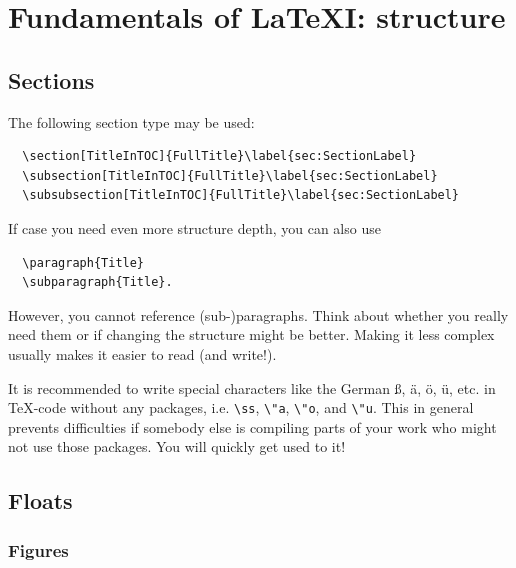 \section{Fundamentals of \LaTeX I: structure}
\label{sec:struct}

\subsection{Sections}
\label{sec:sec}
The following section type may be used:

\begin{verbatim}
  \section[TitleInTOC]{FullTitle}\label{sec:SectionLabel}
  \subsection[TitleInTOC]{FullTitle}\label{sec:SectionLabel}
  \subsubsection[TitleInTOC]{FullTitle}\label{sec:SectionLabel}
\end{verbatim}
If case you need even more structure depth, you can also use

\begin{verbatim}
  \paragraph{Title}
  \subparagraph{Title}.
\end{verbatim}
However, you cannot reference (sub-)paragraphs. Think about whether you really
need them or if changing the structure might be better. Making it less complex
usually makes it easier to read (and write!).

It is recommended to write special characters like the German \ss, \"a,
\"o, \"u, etc. in \TeX-code without any packages, i.e. \verb!\ss!, \verb!\"a!,
\verb!\"o!, and \verb!\"u!. This in general prevents difficulties if somebody
else is compiling parts of your work who might not use those packages. You
will quickly get used to it!

\subsection{Floats}
\label{sec:float}


\subsubsection{Figures}
\label{sec:fig}


